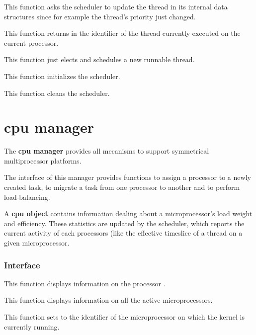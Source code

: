 	 {
	   This function asks the scheduler to update the thread
	    in its internal data structures since
	   for example the thread's priority just changed.
	 }

	 {
	   This function returns in  the identifier
	   of the thread currently executed on the current processor.
	 }

	 {
	   This function just elects and schedules a new runnable thread.
	 }

	 {
	   This function initializes the scheduler.
	 }

	 {
	   This function cleans the scheduler.
	 }

%
%

\section{cpu manager}

The \textbf{cpu manager} provides all mecanisms to support
symmetrical multiprocessor platforms.

The interface of this manager provides functions to assign a processor
to a newly created task, to migrate a task from one processor to
another and to perform load-balancing.

A \textbf{cpu object} contains information dealing about a
microprocessor's load weight and efficiency. These statistics are
updated by the scheduler, which reports the current activity of each
processors (like the effective timeslice of a thread on a given
microprocessor.

%
%

\subsubsection{Interface}

	 {
	   This function displays information on the processor .
	 }

	 {
	   This function displays information on all the active
	   microprocessors.
	 }

	 {
	   This function sets  to the identifier of the
	   microprocessor on which the kernel is currently running.
	 }

